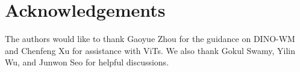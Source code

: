 \section{Acknowledgements} 
\noindent The authors would like to thank Gaoyue Zhou for the guidance on DINO-WM and Chenfeng Xu for assistance with ViTs. We also thank Gokul Swamy, Yilin Wu, and Junwon Seo for helpful discussions.